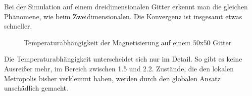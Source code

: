 Bei der Simulation auf einem dreidimensionalen Gitter erkennt man die gleichen Phänomene, wie beim Zweidimensionalen. Die Konvergenz ist insgesamt etwas schneller.

\begin{figure}[H]
	\centering
	\caption{Temperaturabhängigkeit der Magnetisierung auf einem 50x50 Gitter}
	\label{}
\end{figure}

Die Temperaturabhängigkeit unterscheidet sich nur im Detail. So gibt es keine Ausreißer mehr, im Bereich zwischen 1.5 und 2.2. Zustände, die den lokalen Metropolis bisher verklemmt haben, werden durch den globalen Ansatz unschädlich gemacht. 

